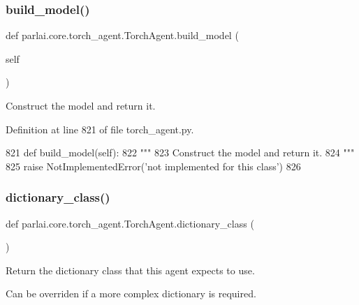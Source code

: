 \subsubsection{\texorpdfstring{build\+\_\+model()}{build\_model()}}
{\footnotesize\ttfamily def parlai.\+core.\+torch\+\_\+agent.\+Torch\+Agent.\+build\+\_\+model (\begin{DoxyParamCaption}\item[{}]{self }\end{DoxyParamCaption})}

\begin{DoxyVerb}Construct the model and return it.
\end{DoxyVerb}
 

Definition at line 821 of file torch\+\_\+agent.\+py.


\begin{DoxyCode}
821     \textcolor{keyword}{def }build\_model(self):
822         \textcolor{stringliteral}{"""}
823 \textcolor{stringliteral}{        Construct the model and return it.}
824 \textcolor{stringliteral}{        """}
825         \textcolor{keywordflow}{raise} NotImplementedError(\textcolor{stringliteral}{'not implemented for this class'})
826 
\end{DoxyCode}
\mbox{\label{classparlai_1_1core_1_1torch__agent_1_1TorchAgent_aea8849fa69a3f5dbd3216c8b06f180ea}} 
\subsubsection{\texorpdfstring{dictionary\+\_\+class()}{dictionary\_class()}}
{\footnotesize\ttfamily def parlai.\+core.\+torch\+\_\+agent.\+Torch\+Agent.\+dictionary\+\_\+class (\begin{DoxyParamCaption}{ }\end{DoxyParamCaption})\hspace{0.3cm}{\ttfamily [static]}}

\begin{DoxyVerb}Return the dictionary class that this agent expects to use.

Can be overriden if a more complex dictionary is required.
\end{DoxyVerb}
 

